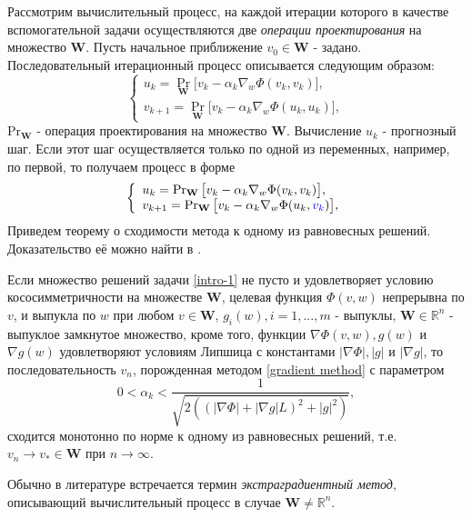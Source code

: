 Рассмотрим вычислительный процесс, на каждой итерации которого в качестве вспомогательной задачи осуществляются две \textit{операции проектирования} на множество $\mathbf{W}$. Пусть начальное приближение $v_0\in \mathbf{W}$ - задано. Последовательный итерационный процесс описывается следующим образом:
\begin{equation}
\label{gradient method}
\left\{\begin{array}{l}
u_{k}=\operatorname{Pr}_{\mathbf{W}} \big[ v_k-\alpha_k\nabla_w\Phi(v_k,v_k)\big],\\
v_{k+1}=\operatorname{Pr}_{\mathbf{W}} \big[ v_k-\alpha_k\nabla_w\Phi(u_k,u_k)\big],
\end{array}\right.
\end{equation} 
$\mathrm{Pr}_{\mathbf{W}}$ - операция проектирования на множество $\mathbf{W}$. Вычисление $u_k$ - прогнозный шаг. Если этот шаг осуществляется только по одной из переменных, например, по первой, то получаем процесс в форме
\begin{equation}
\left\{\begin{array}{l}
u_{k}=\operatorname{Pr}_{\mathbf{W}} \big[ v_k-\alpha_k\nabla_w\Phi(v_k,v_k)\big],\\
v_{k+1}=\operatorname{Pr}_{\mathbf{W}} \big[ v_k-\alpha_k\nabla_w\Phi(u_k,\textcolor{blue}{v_k})\big],
\end{array}\right.
\end{equation}
Приведем теорему о сходимости метода к одному из равновесных решений. Доказательство её можно найти в \cite{8}\cite{8-2}.
\begin{theo}
	Если множество решений задачи \eqref{intro-1} не пусто и удовлетворяет условию кососимметричности\cite{8} на множестве $\mathbf{W}$, целевая функция $\Phi(v,w)$ непрерывна по $v$, и выпукла по $w$ при любом $v\in\mathbf{W}$, $g_i(w),i=1,...,m$ - выпуклы, $\mathbf{W}\in\mathbb{R}^n$ - выпуклое замкнутое множество, кроме того, функции $\nabla\Phi(v,w),g(w)$ и $\nabla g(w)$ удовлетворяют условиям Липшица с константами $|\nabla\Phi|,|g|$ и $|\nabla g|$, то последовательность $v_n$, порожденная методом \eqref{gradient method} с параметром
	\begin{equation*}
	0<\alpha_k<\frac{1}{\sqrt{2((|\nabla\Phi|+|\nabla g|L)^2+|g|^2)}},
	\end{equation*}
	 сходится монотонно по норме к одному из равновесных решений, т.е. $v_n\to v_*\in \mathbf{W}$ при $n\to \infty$.
\end{theo}
Обычно в литературе встречается термин \textit{экстраградиентный метод}, описывающий вычислительный процесс в случае $\mathbf{W}\ne \mathbb{R}^n$. 
 
